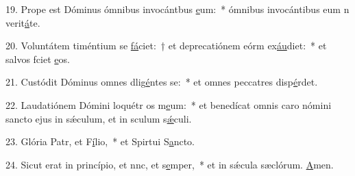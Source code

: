 19. Prope est Dóminus ómnibus invocántbus \uline{e}um:~* ómnibus invocántibus eum n verit\uline{á}te.\par 
20. Voluntátem timéntium se \uline{fá}ciet:~† et deprecatiónem eórm ex\uline{áu}diet:~* et salvos fciet \uline{e}os.\par 
21. Custódit Dóminus omnes dlig\uline{é}ntes se:~* et omnes peccatres disp\uline{é}rdet.\par 
22. Laudatiónem Dómini loquétr os m\uline{e}um:~* et benedícat omnis caro nómini sancto ejus in sǽculum, et in sculum s\uline{ǽ}culi.\par 
23. Glória Patr, et F\uline{í}lio,~* et Spirtui S\uline{a}ncto.\par 
24. Sicut erat in princípio, et nnc, et s\uline{e}mper,~* et in sǽcula sæclórum. \uline{A}men.\par 
